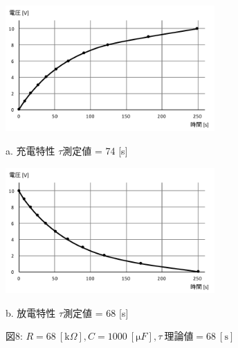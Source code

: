 \documentclass[uplatex]{jsarticle}
\begin{document}
			\begin{figure}[h]
				\begin{minipage}{0.5\hsize}
					\begin{center}
						\includegraphics[width = 8cm]{8-a.pdf}
					\end{center}
					\captionsetup{labelformat=empty,labelsep=none}
					\caption{a. 充電特性 $\tau$測定値 = 74 [s]}
				\end{minipage}
				\begin{minipage}{0.5\hsize}
					\begin{center}
						\includegraphics[width = 8cm]{8-b.pdf}
					\end{center}
					\captionsetup{labelformat=empty,labelsep=none}
					\caption{b. 放電特性 $\tau$測定値 = 68 [s]}
				\end{minipage}
				\captionsetup{labelformat=empty,labelsep=none}
				\caption{図8: $R = 68 \ [\mathrm k \Omega], C = 1000 \ [\mathrm \mu F], \tau \ 理論値 = 68 \ [\mathrm s]$}
			\end{figure}
\end{document}
